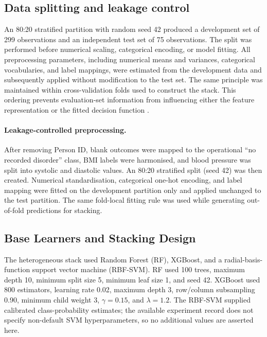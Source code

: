 \documentclass{elektr}
\begin{document}
\FloatBarrier

\subsection{Data splitting and leakage control}
An 80:20 stratified partition with random seed 42 produced a development set of 299 observations and an independent test set of 75 observations. The split was performed before numerical scaling, categorical encoding, or model fitting. All preprocessing parameters, including numerical means and variances, categorical vocabularies, and label mappings, were estimated from the development data and subsequently applied without modification to the test set. The same principle was maintained within cross-validation folds used to construct the stack. This ordering prevents evaluation-set information from influencing either the feature representation or the fitted decision function \cite{kapoor2023,efthimiou2024}.

\paragraph{Leakage-controlled preprocessing.}
After removing Person ID, blank outcomes were mapped to the operational ``no recorded disorder'' class, BMI labels were harmonised, and blood pressure was split into systolic and diastolic values. An 80:20 stratified split (seed 42) was then created. Numerical standardisation, categorical one-hot encoding, and label mapping were fitted on the development partition only and applied unchanged to the test partition. The same fold-local fitting rule was used while generating out-of-fold predictions for stacking.

\subsection{Base Learners and Stacking Design}
The heterogeneous stack used Random Forest (RF), XGBoost, and a radial-basis-function support vector machine (RBF-SVM). RF used 100 trees, maximum depth 10, minimum split size 5, minimum leaf size 1, and seed 42. XGBoost used 800 estimators, learning rate 0.02, maximum depth 3, row/column subsampling 0.90, minimum child weight 3, $\gamma=0.15$, and $\lambda=1.2$. The RBF-SVM supplied calibrated class-probability estimates; the available experiment record does not specify non-default SVM hyperparameters, so no additional values are asserted here.
\end{document}
